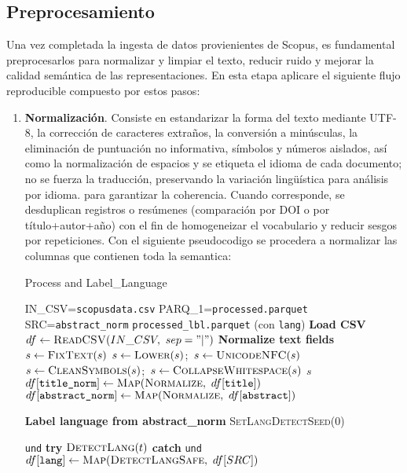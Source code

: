 \subsection{Preprocesamiento}
Una vez completada la ingesta de datos provienientes de Scopus, es fundamental preprocesarlos para normalizar y limpiar el texto, reducir ruido y mejorar la calidad semántica de las representaciones.
En esta etapa aplicare el siguiente flujo reproducible compuesto por estos pasos:
\begin{enumerate}
    \item \textbf{Normalización}. Consiste en estandarizar la forma del texto mediante 
    UTF-8, la corrección de caracteres extraños, la conversión a minúsculas, la eliminación de puntuación no informativa, 
    símbolos y números aislados, así como la normalización de espacios y se etiqueta el idioma de cada documento; no se fuerza la traducción, preservando la variación lingüística para análisis por idioma.
    para garantizar la coherencia. Cuando corresponde, se desduplican registros o resúmenes 
    (comparación por DOI o por título+autor+año) con el fin de homogeneizar el vocabulario y reducir sesgos por repeticiones.
Con el siguiente pseudocodigo se procedera a normalizar las columnas que contienen toda la semantica:
\begin{algorithmEN}
\caption{Process and Label\_Language}
\begin{algorithmic}[1]
\Require IN\_CSV=\texttt{scopusdata.csv}
\Require PARQ\_1=\texttt{processed.parquet}
\Require SRC=\texttt{abstract\_norm}
\Ensure   \texttt{processed\_lbl.parquet} (con \texttt{lang})
\Statex \textbf{Load CSV}
\State $df \leftarrow \textsc{ReadCSV}(IN\_CSV,\ sep="|")$
\Statex \textbf{Normalize text fields}
  \State $s \leftarrow \textsc{FixText}(s)$ 
  \State $s \leftarrow \textsc{Lower}(s)$;\ $s \leftarrow \textsc{UnicodeNFC}(s)$ 
  \State $s \leftarrow \textsc{CleanSymbols}(s)$;\ $s \leftarrow \textsc{CollapseWhitespace}(s)$ 
  \State \Return $s$
\EndFunction
\State $df[\texttt{title\_norm}] \leftarrow \textsc{Map}(\textsc{Normalize},\ df[\texttt{title}])$
\State $df[\texttt{abstract\_norm}] \leftarrow \textsc{Map}(\textsc{Normalize},\ df[\texttt{abstract}])$

\Statex \textbf{Label language from abstract\_norm}
\State \textsc{SetLangDetectSeed}(0)

   \State \Return \texttt{und} \EndIf
  \State \textbf{try} \State \Return $\textsc{DetectLang}(t)$
  \State \textbf{catch} \State \Return \texttt{und}
\EndFunction
\State $df[\texttt{lang}] \leftarrow \textsc{Map}(\textsc{DetectLangSafe},\ df[SRC])$


\end{algorithmic}
\end{algorithmEN}
\end{enumerate}
